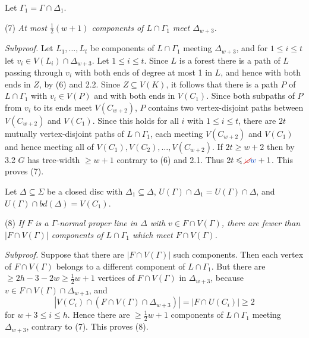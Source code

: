 Let $\Gamma_1 = \Gamma \cap \Delta_1$.

\hspace*{12pt}(7) \textit{At most $\frac{1}{2}(w + 1)$ components of $L \cap \Gamma_1$ meet $\Delta_{w+3}$.}

\textit{Subproof.} Let $L_1, \ldots, L_t$ be components of $L \cap \Gamma_1$ meeting $\Delta_{w+3}$, and for $1 \le i \le t$ let $v_i \in V(L_i) \cap \Delta_{w+3}$. Let $1 \le i \le t$. Since $L$ is a forest there is a path of $L$ passing through $v_i$ with both ends of degree at most 1 in $L$, and hence with both ends in $Z$, by (6) and 2.2. Since $Z \subseteq V(K)$, it follows that there is a path $P$ of $L \cap \Gamma_1$ with $v_i \in V(P)$ and with both ends in $V(C_1)$. Since both subpaths of $P$ from $v_i$ to its ends meet $V(C_{w+2})$, $P$ contains two vertex-disjoint paths between $V(C_{w+2})$ and $V(C_1)$. Since this holds for all $i$ with $1 \le i \le t$, there are $2t$ mutually vertex-disjoint paths of $L \cap \Gamma_1$, each meeting $V(C_{w+2})$ and $V(C_1)$ and hence meeting all of $V(C_1), V(C_2), \ldots, V(C_{w+2})$. If $2t \ge w + 2$ then by 3.2 $G$ has tree-width $\ge w + 1$ contrary to (6) and 2.1. Thus $2t \le \delm{\omega}\fix{w} + 1$. This proves (7).

Let $\Delta \subseteq \Sigma$ be a closed disc with $\Delta_1 \subseteq \Delta$, $U(\Gamma) \cap \Delta_1 = U(\Gamma) \cap \Delta$, and $U(\Gamma) \cap bd(\Delta) = V(C_1)$.

\hspace*{12pt}(8) \textit{If $F$ is a $\Gamma$-normal proper line in $\Delta$ with $v \in F \cap V(\Gamma)$, there are fewer than $|F \cap V(\Gamma)|$ components of $L \cap \Gamma_1$ which meet $F \cap V(\Gamma)$.}

\textit{Subproof.} Suppose that there are $|F \cap V(\Gamma)|$ such components. Then each vertex of $F \cap V(\Gamma)$ belongs to a different component of $L \cap \Gamma_1$. But there are $\ge 2h - 3 - 2w \ge \frac{1}{2}w + 1$ vertices of $F \cap V(\Gamma)$ in $\Delta_{w+3}$, because $v \in F \cap V(\Gamma) \cap \Delta_{w+3}$, and
\begin{equation*}
|V(C_i) \cap (F \cap V(\Gamma) \cap \Delta_{w+3})| = |F \cap U(C_i)| \ge 2
\end{equation*}
for $w + 3 \le i \le h$. Hence there are $\ge \frac{1}{2}w + 1$ components of $L \cap \Gamma_1$ meeting $\Delta_{w+3}$, contrary to (7). This proves (8).
